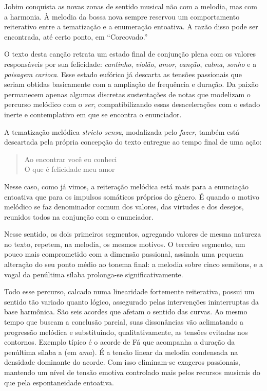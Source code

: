 Jobim conquista as novas zonas de sentido musical não com a melodia, mas
com a harmonia. À melodia da bossa nova sempre reservou um comportamento
reiterativo entre a tematização e a enumeração entoativa. A razão disso
pode ser encontrada, até certo ponto, em ``Corcovado.''

O texto desta canção retrata um estado final de conjunção plena com os
valores responsáveis por sua felicidade: \textit{cantinho}, \textit{violão}, \textit{amor},
\textit{canção}, \textit{calma}, \textit{sonho} e a \textit{paisagem carioca}. Esse estado eufórico já
descarta as tensões passionais que seriam obtidas basicamente com a
ampliação de frequência e duração. Da paixão permanecem apenas algumas
discretas sustentações de notas que modelizam o percurso melódico com o
\textit{ser}, compatibilizando essas desacelerações com o estado inerte e
contemplativo em que se encontra o enunciador.

A tematização melódica \textit{stricto sensu}, modalizada pelo \textit{fazer}, também
está descartada pela própria concepção do texto entregue ao tempo final
de uma ação:

\begin{verse}
\small{Ao encontrar você eu conheci\\
O que é felicidade meu amor}
\end{verse}

Nesse caso, como já vimos, a reiteração melódica está mais para a
enunciação entoativa que para os impulsos somáticos próprios do gênero.
É quando o motivo melódico se faz denominador comum dos valores, das
virtudes e dos desejos, reunidos todos na conjunção com o enunciador.

Nesse sentido, os dois primeiros segmentos, agregando valores de mesma
natureza no texto, repetem, na melodia, os mesmos motivos. O terceiro
segmento, um pouco mais comprometido com a dimensão passional, assinala
uma pequena alteração do seu ponto médio ao tonema final: a melodia
sobre cinco semitons, e a vogal da penúltima sílaba prolonga-se
significativamente.


Todo esse percurso, calcado numa linearidade fortemente reiterativa,
possui um sentido tão variado quanto lógico, assegurado pelas
intervenções ininterruptas da base harmônica. São seis acordes que
afetam o sentido das curvas. Ao mesmo tempo que buscam a conclusão
parcial, suas dissonâncias vão aclimatando a progressão melódica e
substituindo, qualitativamente, as tensões evitadas nos contornos.
Exemplo típico é o acorde de Fá que acompanha a duração da penúltima
sílaba a (em \textit{ama}). É a tensão linear da melodia condensada na
densidade dominante do acorde. Com isso eliminam-se exageros passionais,
mantendo um nível de tensão emotiva controlado mais pelos recursos
musicais do que pela espontaneidade entoativa.

